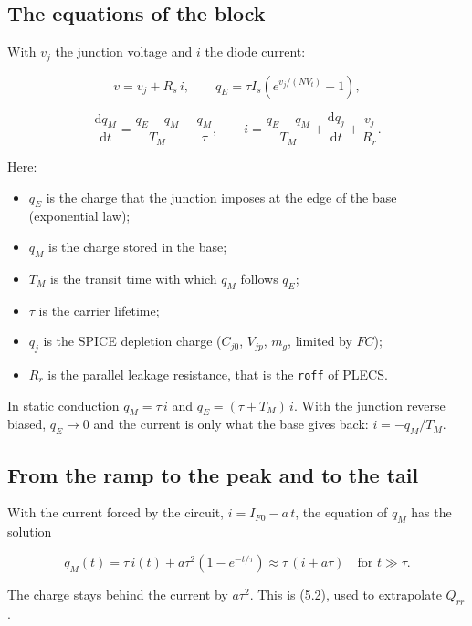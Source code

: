 \documentclass[11pt,a4paper,numbers=noenddot]{scrartcl}
\providecommand{\tightlist}{\setlength{\itemsep}{0pt}\setlength{\parskip}{0pt}}
\begin{document}
\begin{onehalfspace}
\subsection{The equations of the block}\label{the-equations-of-the-block}

With \(v_j\) the junction voltage and \(i\) the diode current:

\[v = v_j + R_s\, i, \qquad q_E = \tau I_s \left(e^{v_j/(N V_t)} - 1\right),\]

\[\frac{\mathrm{d}q_M}{\mathrm{d}t} = \frac{q_E - q_M}{T_M} - \frac{q_M}{\tau}, \qquad i = \frac{q_E - q_M}{T_M} + \frac{\mathrm{d}q_j}{\mathrm{d}t} + \frac{v_j}{R_r}. \tag{7.1}\]

Here:

\begin{itemize}
\tightlist
\item
  \(q_E\) is the charge that the junction imposes at the edge of the base (exponential law);
\item
  \(q_M\) is the charge stored in the base;
\item
  \(T_M\) is the transit time with which \(q_M\) follows \(q_E\);
\item
  \(\tau\) is the carrier lifetime;
\item
  \(q_j\) is the SPICE depletion charge (\(C_{j0}\), \(V_{jp}\), \(m_g\), limited by \(FC\));
\item
  \(R_r\) is the parallel leakage resistance, that is the \texttt{roff} of PLECS.
\end{itemize}

In static conduction \(q_M = \tau\, i\) and \(q_E = (\tau + T_M)\, i\). With the junction reverse biased, \(q_E \to 0\) and the current is only what the base gives back: \(i = -q_M/T_M\).

\subsection{From the ramp to the peak and to the tail}\label{from-the-ramp-to-the-peak-and-to-the-tail}

With the current forced by the circuit, \(i = I_{F0} - a\,t\), the equation of \(q_M\) has the solution

\[q_M(t) = \tau\, i(t) + a\tau^2 \left(1 - e^{-t/\tau}\right) \approx \tau\,(i + a\tau) \quad \text{for } t \gg \tau. \tag{7.2}\]

The charge stays behind the current by \(a\tau^2\). This is (5.2), used to extrapolate \(Q_{rr}\).


\end{onehalfspace}
\end{document}
